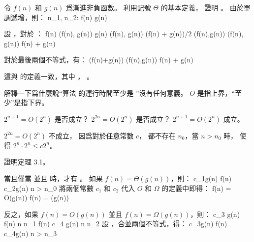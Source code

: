 \startsection[
  title={Asymptotic notation: formal definitions},
]

\startEXERCISE
令 $f(n)$ 和 $g(n)$ 爲漸進非負函數。
利用記號 $\Theta$ 的基本定義，
證明 。
\stopEXERCISE
\startANSWER
由於單調遞增，則：
\startsplitformula\startalign[n=3]
\NC \exists n_1, n_2: \NC f(n)  \NC \quad{} \NR
\NC                   \NC g(n)  \NC \quad{} \NR
\stopalign\stopsplitformula

設 ，對於 ：
\startsplitformula\startalign
\NC f(n) \NC \leq \max(f(n), g(n)) \NR
\NC g(n) \NC \leq \max(f(n), g(n)) \NR
\NC (f(n) + g(n))/2 \NC \leq \max(f(n),g(n)) \NR
\NC \max(f(n), g(n)) \NC \leq f(n) + g(n) \NR
\stopalign\stopsplitformula

對於最後兩個不等式，有：
 \leq {}(f(n)+g(n)) \leq \max(f(n),g(n)) \leq f(n) + g(n)
\stopformula

這與  的定義一致，其中 ， 。
\stopANSWER

\startEXERCISE
解釋一下爲什麼說“算法  的運行時間至少是 ”沒有任何意義。
\stopEXERCISE
\startANSWER
$O$ 是指上界，“至少”是指下界。
\stopANSWER

\startEXERCISE
$2^{n+1} = O(2^n)$ 是否成立？
$2^{2n} = O(2^n)$ 是否成立？
\stopEXERCISE
\startANSWER
$2^{n+1} = O(2^n)$ 成立。

$2^{2n} = O(2^n)$ 不成立，
因爲對於任意常數 $c$，
都不存在 $n_0$，當 $n>n_0$ 時，
使得 $2^n \cdot 2^n \leq c 2^n$。
\stopANSWER

\startEXERCISE
證明定理 3.1。

當且僅當  並且  時，才有 。
\stopEXERCISE
\startANSWER
如果 $f(n) = \Theta(g(n))$，則：
 \le c_1g(n) \le f(n) \le c_2g(n) \quad {} n > n_0
\stopformula
將兩個常數 $c_1$ 和 $c_2$ 代入 $O$ 和 $\Omega$ 的定義中即得：
\startsplitformula\startalign
\NC f(n) \NC = O(g(n)) \NR
\NC f(n) \NC = \Omega(g(n)) \NR
\stopalign\stopsplitformula

反之，如果 $f(n) = O(g(n))$ 並且 $f(n) = \Omega(g(n))$，則：
\startsplitformula\startalign
{} \le c_3 g(n) \le f(n) \NC \quad {} n \ge n_1 \NR
{} \le f(n) \le c_4 g(n) \NC \quad {} n \ge n_2 \NR
\stopalign\stopsplitformula
設 ，合並兩個不等式，得：
 \leq c_3g(n) \leq f(n) \leq c_4g(n) \quad {} n > n_3
\stopformula
\stopANSWER

